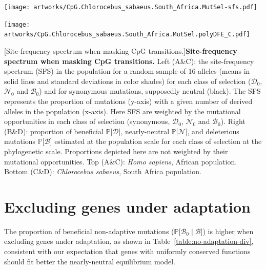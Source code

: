 \documentclass{article}
\newcommand{\proba}{\mathbb{P}}
\newcommand{\Sphy}{S_{0}}
\newcommand{\SphyDel}{\mathcal{D}_0}
\newcommand{\SphyNeu}{\mathcal{N}_0}
\newcommand{\SphyBen}{\mathcal{B}_0}
\newcommand{\given}{\mid}
\newcommand{\Spop}{S}
\newcommand{\SpopDel}{\mathcal{D}}
\newcommand{\SpopNeu}{\mathcal{N}}
\newcommand{\SpopBen}{\mathcal{B}}
\newcommand{\ProbaPopDel}{\proba{[} \SpopDel]}
\newcommand{\ProbaPopNeu}{\proba{[} \SpopNeu ]}
\newcommand{\ProbaPopBen}{\proba{[} \SpopBen ]}
\begin{document}
    \begin{center}
        \begin{minipage}{0.49\linewidth}
            \texttt{[image: artworks/CpG.Chlorocebus\_sabaeus.South\_Africa.MutSel-sfs.pdf]}
        \end{minipage}
        \begin{minipage}{0.49\linewidth}
            \flushleft* {\tiny D: $\Spop$ as function of $\Sphy$ for each class}
            \texttt{[image: artworks/CpG.Chlorocebus\_sabaeus.South\_Africa.MutSel.polyDFE\_C.pdf]}
        \end{minipage}
    [Site-frequency spectrum when masking CpG transitions.]{\textbf{Site-frequency spectrum when masking CpG transitions.} Left (A\&C): the site-frequency spectrum (SFS) in the population for a random sample of 16 alleles (means in solid lines and standard deviations in color shades) for each class of selection ($\SphyDel$, $\SphyNeu$ and $\SphyBen$) and for synonymous mutations, supposedly neutral (black). The SFS represents the proportion of mutations (y-axis) with a given number of derived alleles in the population (x-axis). Here SFS are weighted by the mutational opportunities in each class of selection (synonymous, $\SphyDel$, $\SphyNeu$ and $\SphyBen$). Right (B\&D): proportion of beneficial $\ProbaPopDel$, nearly-neutral $\ProbaPopNeu$, and deleterious mutations $\ProbaPopBen$  estimated at the population scale for each class of selection at the phylogenetic scale. Proportions depicted here are not weighted by their mutational opportunities. Top (A\&C): \textit{Homo sapiens}, African population. Bottom (C\&D): \textit{Chlorocebus sabaeus}, South Africa population.}
    \label{mutsel-dfe-sfs}
    \end{center}



    \newpage

    \section{Excluding genes under adaptation}
    The proportion of beneficial non-adaptive mutations ($\proba{[}\SphyBen\given \SpopBen {]}$) is higher when excluding genes under adaptation, as shown in Table~\ref{table:no-adaptation-div}, consistent with our expectation that genes with uniformly conserved functions should fit better the nearly-neutral equilibrium model.
\end{document}
